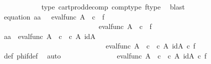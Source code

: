 \begin{isabellebody}
\ \ \ \ \ \ \ \ \ \ \isamarkupfalse%
\ {\isasymphi}{\isacharunderscore}{\kern0pt}type\ cart{\isacharunderscore}{\kern0pt}prod{\isacharunderscore}{\kern0pt}decomp\ comp{\isacharunderscore}{\kern0pt}type\ f{\isacharunderscore}{\kern0pt}type\ \isamarkupfalse%
\ blast\isanewline
\ \ \ \ \ \ \ \ \isamarkupfalse%
\ equation{}{\isacharcolon}{\kern0pt}\ {\isachardoublequoteopen}{\isasymlangle}a{}{\isacharcomma}{\kern0pt}a{}{\isasymrangle}\ {\isacharequal}{\kern0pt}\ \ {\isasymlangle}eval{\isacharunderscore}{\kern0pt}func\ A\ {\isasymOmega}\ {\isasymcirc}\isactrlsub c\ {\isasymlangle}{\isasymt}{\isacharcomma}{\kern0pt}\ f{\isasymrangle}{\isacharcomma}{\kern0pt}\isanewline
\ \ \ \ \ \ \ \ \ \ \ \ \ \ \ \ \ \ \ \ \ \ \ \ \ \ \ \ eval{\isacharunderscore}{\kern0pt}func\ A\ {\isasymOmega}\ {\isasymcirc}\isactrlsub c\ {\isasymlangle}{\isasymf}{\isacharcomma}{\kern0pt}\ f{\isasymrangle}{\isasymrangle}{\isachardoublequoteclose}\isanewline
\ \ \ \ \ \ \ \ \isamarkupfalse%
\ {\isacharminus}{\kern0pt}\ \isanewline
\ \ \ \ \ \ \ \ \ \ \isamarkupfalse%
\ {\isachardoublequoteopen}{\isasymlangle}a{}{\isacharcomma}{\kern0pt}a{}{\isasymrangle}\ {\isacharequal}{\kern0pt}\ {\isasymlangle}eval{\isacharunderscore}{\kern0pt}func\ A\ {\isasymOmega}\ {\isasymcirc}\isactrlsub c\ {\isasymlangle}{\isasymt}\ {\isasymcirc}\isactrlsub c\ {\isasymbeta}\isactrlbsub A\isactrlbsup {\isasymOmega}\isactrlesup \isactrlesub {\isacharcomma}{\kern0pt}\ id{\isacharparenleft}{\kern0pt}A\isactrlbsup {\isasymOmega}\isactrlesup {\isacharparenright}{\kern0pt}{\isasymrangle}{\isacharcomma}{\kern0pt}\isanewline
\ \ \ \ \ \ \ \ \ \ \ \ \ \ \ \ \ \ \ \ \ \ \ \ \ \ \ \ \ \ eval{\isacharunderscore}{\kern0pt}func\ A\ {\isasymOmega}\ {\isasymcirc}\isactrlsub c\ {\isasymlangle}{\isasymf}\ {\isasymcirc}\isactrlsub c\ {\isasymbeta}\isactrlbsub A\isactrlbsup {\isasymOmega}\isactrlesup \isactrlesub {\isacharcomma}{\kern0pt}\ id{\isacharparenleft}{\kern0pt}A\isactrlbsup {\isasymOmega}\isactrlesup {\isacharparenright}{\kern0pt}{\isasymrangle}{\isasymrangle}\ {\isasymcirc}\isactrlsub c\ f{\isachardoublequoteclose}\isanewline
\ \ \ \ \ \ \ \ \ \ \ \ \isamarkupfalse%
\ {\isasymphi}{\isacharunderscore}{\kern0pt}def\ phi{\isacharunderscore}{\kern0pt}f{\isacharunderscore}{\kern0pt}def\ \isamarkupfalse%
\ auto\isanewline
\ \ \ \ \ \ \ \ \ \ \isamarkupfalse%
\ \isamarkupfalse%
\ {\isachardoublequoteopen}{\isachardot}{\kern0pt}{\isachardot}{\kern0pt}{\isachardot}{\kern0pt}\ {\isacharequal}{\kern0pt}\ {\isasymlangle}eval{\isacharunderscore}{\kern0pt}func\ A\ {\isasymOmega}\ {\isasymcirc}\isactrlsub c\ {\isasymlangle}{\isasymt}\ {\isasymcirc}\isactrlsub c\ {\isasymbeta}\isactrlbsub A\isactrlbsup {\isasymOmega}\isactrlesup \isactrlesub {\isacharcomma}{\kern0pt}\ id{\isacharparenleft}{\kern0pt}A\isactrlbsup {\isasymOmega}\isactrlesup {\isacharparenright}{\kern0pt}{\isasymrangle}\ {\isasymcirc}\isactrlsub c\ f{\isacharcomma}{\kern0pt}\isanewline

\end{isabellebody}
